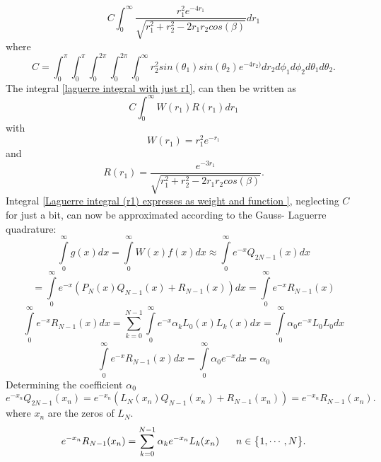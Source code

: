 \documentclass[10pt,a4paper]{article}
\begin{document}
\begin{equation}\label{laguerre integral with just r1}
C\int_{0}^{\infty}\frac{r_1^2e^{-4r_1}}{\sqrt{r_1^2+r_2^2-2r_1r_2cos(\beta)}}dr_1
\end{equation}
where
\begin{equation*}
C = \int_{0}^{\pi}\int_{0}^{\pi}\int_{0}^{2\pi}\int_{0}^{2\pi}\int_{0}^{\infty} r_2^2sin(\theta_1)sin(\theta_2)e^{-4r_2)}dr_2d\phi_1d\phi_2d\theta_1d\theta_2.
\end{equation*}
The integral \ref{laguerre integral with just r1}, can then be written as
\begin{equation}\label{Laguerre integral (r1) expresses as weight and function }
C\int_{0}^{\infty}W(r_1)R(r_1)dr_1
\end{equation}
with
\begin{equation*}
W(r_1)=r_1^2 e^{-r_1}
\end{equation*}
and
\begin{equation*}
R(r_1)=\frac{e^{-3r_1}}{\sqrt{r_1^2+r_2^2-2r_1r_2cos(\beta)}}.
\end{equation*}
Integral \ref{Laguerre integral (r1) expresses as weight and function }, neglecting $C$ for just a bit, can now be approximated according to the Gauss- Laguerre quadrature:
\begin{equation*}
\int\limits_0^\infty g(x)dx = \int\limits_0^\infty W(x)f(x)dx \approx \int\limits_0^\infty e^{-x}Q_{2N-1}(x)dx
\end{equation*}
\begin{equation*}
=\int\limits_0^\infty e^{-x} \left(P_N(x)Q_{N-1}(x)+R_{N-1}(x)\right)dx = \int\limits_0^\infty e^{-x}R_{N-1}(x)
\end{equation*}
\begin{equation*}
\int\limits_0^\infty e^{-x}R_{N-1}(x)dx = \sum\limits_{k=0}^{N-1}  \int\limits_0^\infty e^{-x}\alpha_kL_0(x) L_k(x)dx = \int\limits_0^\infty \alpha_0 e^{-x} L_0L_0 dx
\end{equation*}
\begin{equation}\label{laguerre integral equality with a0}
\int\limits_0^\infty e^{-x}R_{N-1}(x)dx = \int\limits_0^\infty \alpha_0 e^{-x}dx = \alpha_0
\end{equation}
Determining the coefficient $\alpha_0$
\begin{equation*}
e^{-x_n}Q_{2N-1}(x_n) = e^{-x_n}\left( L_N(x_n)Q_{N-1}(x_n)+R_{N-1}(x_n)\right) = e^{-x_n}R_{N-1}(x_n).
\end{equation*}
where $x_n$ are the zeros of $L_N$.
\begin{equation}\label{restless sum for laguerre}
e^{-x_n}R_{N-1}(x_n) = \sum\limits_{k=0}^{N-1} \alpha_k e^{-x_n} L_k(x_n)\hspace{6mm}n \in \big\{1,\cdots,N\big\}.
\end{equation}
\end{document}
